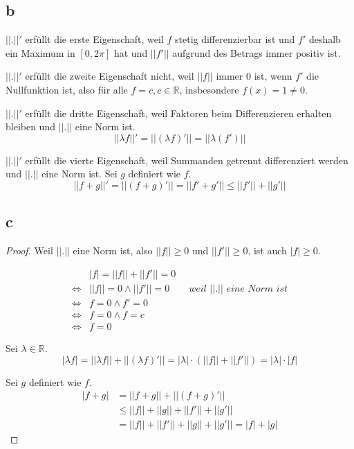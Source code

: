 \documentclass[10pt,a4paper]{article}
\begin{document}
\subsection*{b}

$||.||'$ erfüllt die erste Eigenschaft, weil $f$ stetig differenzierbar ist und $f'$ deshalb ein Maximum in $[0, 2\pi]$ hat und $||f'||$ aufgrund des Betrags immer positiv ist.

$||.||'$ erfüllt die zweite Eigenschaft nicht, weil $||f||$ immer $0$ ist, wenn $f'$ die Nullfunktion ist, also für alle $f = c, c \in \mathbb{R}$, insbesondere $f(x) = 1 \ne 0$.

$||.||'$ erfüllt die dritte Eigenschaft, weil Faktoren beim Differenzieren erhalten bleiben und $||.||$ eine Norm ist.
\begin{equation}
||\lambda f||' = ||(\lambda f)'|| = ||\lambda (f')||
\end{equation}

$||.||'$ erfüllt die vierte Eigenschaft, weil Summanden getrennt differenziert werden und $||.||$ eine Norm ist.
Sei $g$ definiert wie $f$.
\begin{equation}
||f + g||' = ||(f + g)'|| = ||f' + g'|| \le ||f'|| + ||g'||
\end{equation}

\subsection*{c}

\begin{proof}
Weil $||.||$ eine Norm ist, also $||f|| \ge 0$ und $||f'|| \ge 0$, ist auch $|f| \ge 0$.

\begin{align}
& |f| = ||f|| + ||f'|| = 0\\
\Leftrightarrow & ||f|| = 0 \land ||f'|| = 0 \qquad \textit{weil $||.||$ eine Norm ist}\\
\Leftrightarrow & f = 0 \land f' = 0\\
\Leftrightarrow & f = 0 \land f = c\\
\Leftrightarrow & f = 0
\end{align}

Sei $\lambda \in \mathbb{R}$.
\begin{equation}
|\lambda f| = ||\lambda f|| + ||(\lambda f)'|| = |\lambda| \cdot \left( ||f|| + ||f'|| \right) = |\lambda| \cdot |f|
\end{equation}

Sei $g$ definiert wie $f$.
\begin{align}
|f + g| & = ||f + g|| + ||(f + g)'||\\
& \le ||f|| + ||g|| + ||f'|| + ||g'||\\
& = ||f|| + ||f'|| + ||g|| + ||g'|| = |f| + |g|
\end{align}
\end{proof}
\end{document}
